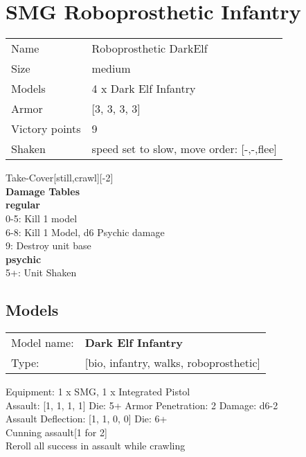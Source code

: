 \clearpage

\section{ SMG Roboprosthetic Infantry }

\begin{tabular}{ll}
  Name & Roboprosthetic DarkElf \\
  Size & medium\\
  Models & 4 x Dark Elf Infantry\\
  Armor & [3, 3, 3, 3]\\
  Victory points & 9\\
  Shaken & speed set to slow, move order: [-,-,flee]\\
\end{tabular}

Take-Cover[still,crawl][-2]\\ 



{\bf Damage Tables} \\
 {\bf regular } \\
0-5: Kill 1 model \\
6-8: Kill 1 Model, d6 Psychic damage \\
9: Destroy unit base \\
 {\bf psychic } \\
5+: Unit Shaken \\


\clearpage

\subsection{ Models }

\begin{tabular}{ll}
Model name: & {\bf Dark Elf Infantry } \\
Type: & [bio, infantry, walks, roboprosthetic] \\
\end{tabular}

Equipment: 1 x SMG, 1 x Integrated Pistol \\

Assault: [1, 1, 1, 1] Die: 5+ Armor Penetration: 2 Damage: d6-2 \\
Assault Deflection: [1, 1, 0, 0] Die: 6+\\
\indent Cunning assault[1 for 2]\\ 
Reroll all success in assault while crawling\\ 
 



